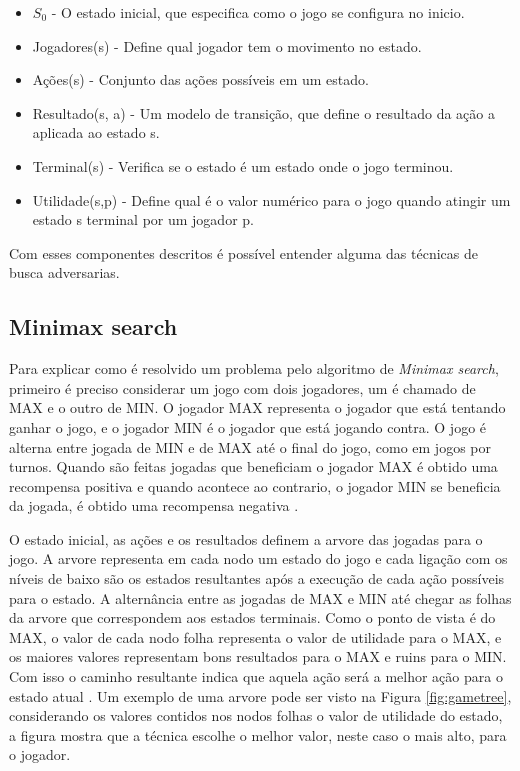 \begin{itemize}
	\item $S_{0}$ - O estado inicial, que especifica como o jogo se configura no inicio.
	\item Jogadores(s) -  Define qual jogador tem o movimento no estado.
	\item Ações(s) - Conjunto das ações possíveis em um estado.
	\item Resultado(s, a) - Um modelo de transição, que define o resultado da ação a aplicada ao estado s.
	\item Terminal(s) - Verifica se o estado é um estado onde o jogo terminou.
	\item Utilidade(s,p) - Define qual é o valor numérico para o jogo quando atingir um estado s terminal por um jogador p. 
\end{itemize}

Com esses componentes descritos é possível entender alguma das técnicas de busca adversarias. 

\subsection{Minimax search}

Para explicar como é resolvido um problema pelo algoritmo de \textit{Minimax search}, primeiro é preciso considerar um jogo com dois jogadores, um é chamado de MAX e o outro de MIN. O jogador MAX representa o jogador que está tentando ganhar o jogo, e o jogador MIN é o jogador que está jogando contra. O jogo é alterna entre jogada de MIN e de MAX até o final do jogo, como em jogos por turnos. Quando são feitas jogadas que beneficiam o jogador MAX é obtido uma recompensa positiva e quando acontece ao contrario, o jogador MIN se beneficia da jogada, é obtido uma recompensa negativa \cite{intelligence2003modern}.
 
O estado inicial, as ações e os resultados definem a arvore das jogadas para o jogo. A arvore representa em cada nodo um estado do jogo e cada ligação com os níveis de baixo são os estados resultantes após a execução de cada ação possíveis para o estado. A alternância entre as jogadas de MAX e MIN até chegar as folhas da arvore que correspondem aos estados terminais. Como o ponto de vista é do MAX, o valor de cada nodo folha representa o valor de utilidade para o MAX, e os maiores valores representam bons resultados para o MAX e ruins para o MIN. Com isso o caminho resultante indica que aquela ação será a melhor ação para o estado atual \cite{intelligence2003modern}. Um exemplo de uma arvore pode ser visto na Figura \ref{fig:gametree}, considerando os valores contidos nos nodos folhas o valor de utilidade do estado, a figura mostra que a técnica escolhe o melhor valor, neste caso o mais alto, para o jogador. 

